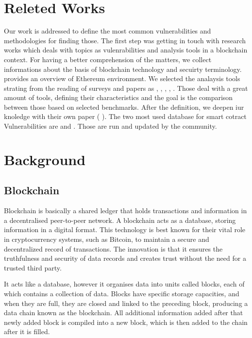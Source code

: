 \documentclass[a4paper,sigconf, language=french,
language=german, language=spanish, language=english]{acmart}
\begin{document}
\section{Releted Works}
\label{RelatedWorks}
Our work is addressed to define the most common vulnerabilities and methodologies for finding those.
The first step was getting in touch with research works which deals with topics as vulenrabilities and analysis tools in a blockchain context. 
For having a better comprehension of the matters, we collect informations about the basis of blockchain technology and secuirty terminology. \cite{ETHfoundation} provides an overview 
of Ethereum environment. 
We selected the analaysis tools strating from the reading of surveys and papers as \cite{SurvTools}, \cite{Thesis}, \cite{AutomaticTools}, \cite{AttacksAndProtection}, \cite{ToolsAndVuln}. 
Those deal with a great amount of tools, defining their characteristics and the goal is the comparison between those based on selected benchmarks. 
After the definition, we deepen iur knoledge with their own paper 
(\cite{Slither} \cite{Echidna} \cite{Manticore} \cite{SmartTest} \cite{Oyente}).
The two most used database for smart cotract Vulnerabilities are \cite{SWC} and \cite{DASP10}. Those are run and updated by the community. 

\section{Background}
\label{Background}

\subsection{Blockchain}
Blockchain is basically a shared ledger that holds transactions and information in a decentralised peer-to-peer network. A blockchain acts as a database, storing information in a digital format. 
This technology is best known for their vital role in cryptocurrency systems, such as Bitcoin, to maintain a secure and decentralized record of transactions. 
The innovation is that it ensures the truthfulness and security of  data records and creates trust without the need for a trusted third party.

It acts like a database, however it organises data into units called blocks, each of which contains a collection of data.
Blocks have specific storage capacities, and when they are full, they are closed and linked to the preceding block, producing a data chain known as the blockchain.
All additional information added after that newly added block is compiled into a new block, which is then added to the chain after it is filled.  
\end{document}
